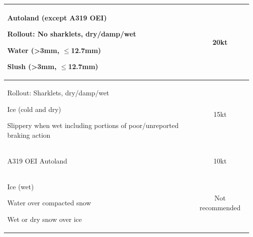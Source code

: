 \documentclass[twoside]{article}
\begin{document}
{\begin{center}
\begin{tabular}{|l|c|}
{\begin{compactitem}
     \item Autoland (except A319 OEI)
     \item\raggedright Rollout: No sharklets, dry/damp/wet
     \item Water (>3mm, $\leq$12.7mm)
     \item Slush (>3mm, $\leq$12.7mm)
    \end{compactitem}
    \vspace{1mm}} & 20kt\\\hline
  \parbox{0.5\textwidth}{
    \vspace{1mm}
    \begin{compactitem}
     \item\raggedright Rollout: Sharklets, dry/damp/wet
     \item Ice (cold and dry)
     \item\raggedright Slippery when wet including portions of poor/unreported
       braking action
    \end{compactitem}
    \vspace{1mm}} & 15kt\\\hline
  \parbox{0.5\textwidth}{
    \vspace{1mm}
    \begin{compactitem}
     \item A319 OEI Autoland
    \end{compactitem}
    \vspace{1mm}} & 10kt\\\hline
  \parbox{0.5\textwidth}{
    \vspace{1mm}
    \begin{compactitem}
     \item Ice (wet)
     \item Water over compacted snow
     \item Wet or dry snow over ice
    \end{compactitem}
    \vspace{1mm}} & Not recommended\\\hline
\end{tabular}
\end{center}
}
\end{document}
